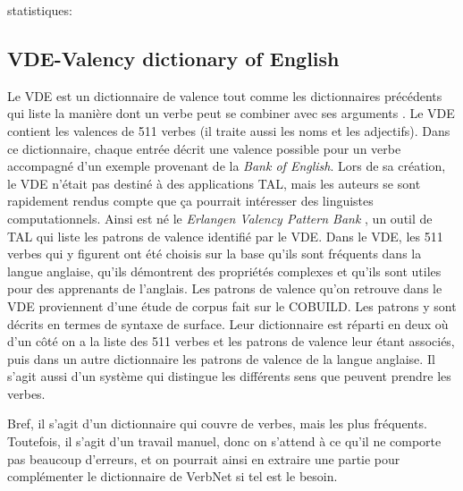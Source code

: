 statistiques:

\subsection{VDE-Valency dictionary of English}
Le VDE est un dictionnaire de valence tout comme les dictionnaires précédents qui liste la manière dont un verbe peut se combiner avec ses arguments \citep{HerbstValencyDictionaryEnglish2004}. Le VDE contient les valences de 511 verbes (il traite aussi les noms et les adjectifs). Dans ce dictionnaire, chaque entrée décrit une valence possible pour un verbe accompagné d'un exemple provenant de la \emph{Bank of English}. Lors de sa création, le VDE n'était pas destiné à des applications TAL, mais les auteurs se sont rapidement rendus compte que ça pourrait intéresser des linguistes computationnels. Ainsi est né le \emph{Erlangen Valency Pattern Bank} \citep{faucris.1039365}, un outil de TAL qui liste les patrons de valence identifié par le VDE.  Dans le VDE, les 511 verbes qui y figurent ont été choisis sur la base qu'ils sont fréquents dans la langue anglaise, qu'ils démontrent des propriétés complexes et qu'ils sont utiles pour des apprenants de l'anglais. Les patrons de valence qu'on retrouve dans le VDE proviennent d'une étude de corpus fait sur le COBUILD. Les patrons y sont décrits en termes de syntaxe de surface.  Leur dictionnaire est réparti en deux où d'un côté on a la liste des 511 verbes et les patrons de valence leur étant associés, puis dans un autre dictionnaire les patrons de valence de la langue anglaise. Il s'agit aussi d'un système qui distingue les différents sens que peuvent prendre les verbes. 

Bref, il s'agit d'un dictionnaire qui couvre de verbes, mais les plus fréquents. Toutefois, il s'agit d'un travail manuel, donc on s'attend à ce qu'il ne comporte pas beaucoup d'erreurs, et on pourrait ainsi en extraire une partie pour complémenter le dictionnaire de VerbNet si tel est le besoin.


